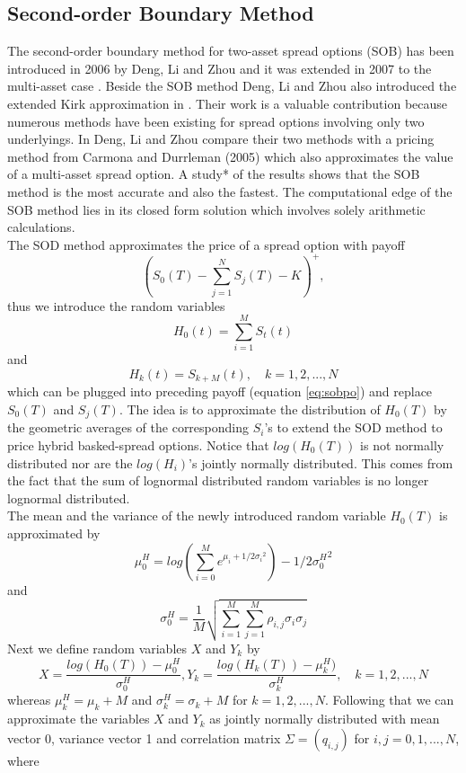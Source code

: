 \documentclass[a4paper]{article}
\begin{document}
\subsection{Second-order Boundary Method}
\label{sec:sob}
The second-order boundary method for two-asset spread options (SOB) has been introduced in 2006 by Deng, Li and Zhou \cite{sob2} and it was extended in 2007 to the multi-asset case \cite{sob}. Beside the SOB method Deng, Li and Zhou also introduced the extended Kirk approximation in \cite{sob}. Their work is a valuable contribution because numerous methods have been existing for spread options involving only two underlyings. In \cite{sob} Deng, Li and Zhou compare their two methods with a pricing method from Carmona and Durrleman (2005) \cite{cd} which also approximates the value of a multi-asset spread option. A study* of the results shows that the SOB method is the most accurate and also the fastest. The computational edge of the SOB method lies in its closed form solution which involves solely arithmetic calculations.\\
The SOD method approximates the price of a spread option with payoff
\begin{equation}
\label{eq:sobpo}
(S_0(T) - \sum_{j=1}^{N}S_j(T) - K)^+, 
\end{equation}
thus we introduce the random variables 
$$H_0(t)=\sum_{i=1}^M S_t(t)$$ 
and 
$$H_k(t)=S_{k+M}(t), \quad k=1,2,...,N$$
which can be plugged into preceding payoff (equation \ref{eq:sobpo}) and replace $S_0(T)$ and $S_j(T)$. The idea is to approximate the distribution of $H_0(T)$ by the geometric averages of the corresponding  $S_i$'s to extend the SOD method to price hybrid basked-spread options. Notice that $log(H_0(T))$ is not normally distributed nor are the $log(H_i)$'s jointly normally distributed. This comes from the fact that the sum of lognormal distributed random variables is no longer lognormal distributed.\\
The mean and the variance of the newly introduced random variable $H_0(T)$ is approximated by 
$$\mu_0^H = log(\sum_{i=0}^{M}e^{\mu_i+1/2{\sigma_i}^2}) - 1/2{\sigma_0^H}^2$$ 
and 
$$\sigma_0^H=\frac{1}{M}\sqrt{\sum_{i=1}^M \sum_{j=1}^M \rho_{i,j} \sigma_i \sigma_j}$$
Next we define random variables $X$ and $Y_k$ by
$$X = \frac{log(H_0(T))-\mu_0^H}{\sigma_0^H}, Y_k = \frac{log(H_k(T))-\mu_k^H)}{\sigma_k^H}, \quad k=1,2,...,N$$
whereas $\mu_k^H = \mu_k+M$ and $\sigma_k^H = \sigma_k+M$ for $k=1,2,...,N$. Following that we can approximate the variables $X$ and $Y_k$ as jointly normally distributed with mean vector 0, variance vector 1 and correlation matrix $\Sigma = (q_{i,j})$ for $i,j=0,1,...,N$, where 
\end{document}
